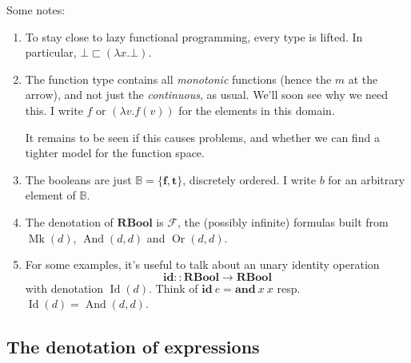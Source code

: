 \documentclass[manuscript,screen,acmsmall,nonacm]{acmart}
\newcommand{\syntax}[1]{\mathbf{#1}}
\newcommand{\tRBool}{\syntax{RBool}}
\newcommand{\sAnd}{\syntax{and}}
\newcommand{\sId}{\syntax{id}}
\newcommand{\dBool}{\mathbb B}
\newcommand{\dFalse}{\mathbf{f}}
\newcommand{\dTrue}{\mathbf{t}}
\newcommand{\dRBool}{\mathcal F}
\newcommand{\dlambda}{\mathit{\lambda}}
\newcommand{\dMk}{\operatorname{Mk}}
\newcommand{\dAnd}{\operatorname{And}}
\newcommand{\dId}{\operatorname{Id}}
\newcommand{\dOr}{\operatorname{Or}}
\begin{document}
Some notes:
\begin{enumerate}
\item To stay close to lazy functional programming, every type is lifted. In particular, $\bot \sqsubset (\dlambda x.\bot)$.

\item The function type contains all \emph{monotonic} functions (hence the $m$ at the arrow), and not just the \emph{continuous}, as usual. We’ll soon see why we need this.
I write $f$ or $(\dlambda v. f(v))$ for the elements in this domain.

It remains to be seen if this causes problems, and whether we can find a tighter model for the function space.

\item The booleans are just $\dBool = \{\dFalse, \dTrue\}$, discretely ordered. I write $b$ for an arbitrary element of $\dBool$.

\item The denotation of $\tRBool$ is $\dRBool$, the (possibly infinite) formulas  built from $\dMk(d)$, $\dAnd(d,d)$ and $\dOr(d,d)$.

\item For some examples, it's useful to talk about an unary identity operation
\[
\sId :: \tRBool \to \tRBool
\]
with denotation $\dId(d)$. Think of $\sId~e = \sAnd~x~x$ resp. $\dId(d)=\dAnd(d,d)$.

\end{enumerate}

\subsection{The denotation of expressions}
\end{document}
